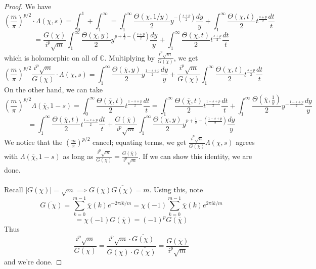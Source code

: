 \begin{proof}
    We have
    \[
        (\frac{m}{\pi})^{p/2}\cdot\Lambda(\chi,s)=\int_0^1+\int_1^{\infty}=\int_1^{\infty}\frac{\Theta(\chi,1/y)}{2}y^{-(\frac{s+p}{2})}\frac{dy}{y}+\int_1^{\infty}\frac{\Theta(\chi,t)}{2}t^{\frac{s+p}{2}}\frac{dt}{t}
    \]
    \[
        =\frac{G(\chi)}{i^p\sqrt{m}}\int_1^{\infty}\frac{\Theta(\overline{\chi},y)}{2}y^{p+\frac{1}{2}-(\frac{s+p}{2})}\frac{dy}{y}+\int_1^{\infty}\frac{\Theta(\chi,t)}{2}t^{\frac{s+p}{2}}\frac{dt}{t}    
    \]
    which is holomorphic on all of $\mathbb{C}$. Multiplying by $\frac{i^p\sqrt{m}}{G(\chi)}$, we get 
    \[
        (\frac{m}{\pi})^{p/2}\frac{i^p\sqrt{m}}{G(\chi)}\cdot\Lambda(\chi,s)=\int_1^{\infty}\frac{\Theta(\overline{\chi},y)}{2}y^{\frac{1-s+p}{2}}\frac{dy}{y}+\frac{i^p\sqrt{m}}{G(\chi)}\int_1^{\infty}\frac{\Theta(\chi,t)}{2}t^{\frac{s+p}{2}}\frac{dt}{t}    
    \]
    On the other hand, we can take 
    \[
        (\frac{m}{\pi})^{p/2}\Lambda(\overline{\chi},1-s)=\int_0^{\infty}
        \frac{\Theta(\overline{\chi},t)}{2}t^{\frac{1-s+p}{2}}\frac{dt}{t}
        =\int_1^{\infty} \frac{\Theta(\overline{\chi},t)}{2}t^{\frac{1-s+p}{2}}\frac{dt}{t}
        +\int_1^{\infty} \frac{\Theta(\overline{\chi},\frac{1}{y})}{2}y^{-\frac{1-s+p}{2}}\frac{dy}{y}
    \]
    \[
        = \int_1^{\infty} \frac{\Theta(\overline{\chi},t)}{2}t^{\frac{1-s+p}{2}}\frac{dt}{t} 
        +\frac{G(\overline{\chi})}{i^p\sqrt{m}}\int_1^{\infty}\frac{\Theta(\chi,y)}{2}y^{p+\frac{1}{2}-(\frac{1-s+p}{2})}\frac{dy}{y}
    \]
    We notice that the $(\frac{m}{\pi})^{p/2}$ cancel; equating terms, we get
    $\frac{i^p\sqrt{n}}{G(\chi)}\Lambda(\chi,s)$ agrees with $\Lambda(\overline{\chi},1-s)$ as long as 
    $\frac{i^p\sqrt{m}}{G(\chi)}=\frac{G(\overline{\chi})}{i^p\sqrt{m}}$. If we can show this identity, 
    we are done.\\\\
    Recall $|G(\chi)|=\sqrt{m} \implies G(\chi)\overline{G(\chi)}=m$. Using this, note
    \[
        \overline{G(\chi)}=\sum_{k=0}^{m-1}\overline{\chi}(k)e^{-2\pi ik/m}=\chi(-1)\sum_{k=0}^{m-1}
        \overline{\chi}(k)e^{2\pi ik/m}
    \]
    \[
        =\chi(-1)G(\overline{\chi})=(-1)^pG(\overline{\chi})  
    \]
    Thus 
    \[
        \frac{i^p\sqrt{m}}{G(\chi)}=\frac{i^p\sqrt{m}\cdot\overline{G(\chi)}}{G(\chi)\cdot\overline{G(\chi)}}    
        =\frac{G(\overline{\chi})}{i^p\sqrt{m}}
    \]
    and we're done.
\end{proof}





